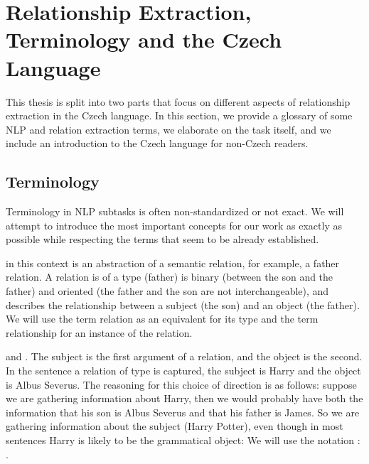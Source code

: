 \chapter{Relationship Extraction, Terminology and the Czech Language} 

This thesis is split into two parts that focus on different aspects of relationship extraction in the Czech language. In this section, we provide a glossary of some NLP and relation extraction terms, we elaborate on the task itself, and we include an introduction to the Czech language for non-Czech readers.


\section{Terminology}
Terminology in NLP subtasks is often non-standardized or not exact. We will attempt to introduce the most important concepts for our work as exactly as possible while respecting the terms that seem to be already established. 


 in this context is an abstraction of a semantic relation, for example, a father relation. A relation is of a type (father) is binary (between the son and the father) and oriented (the father and the son are not interchangeable), and describes the relationship between a subject (the son) and an object (the father). We will use the term relation as an equivalent for its type and the term relationship for an instance of the relation. 


 and . The subject is the first argument of a relation, and the object is the second. In the sentence  a relation of type  is captured, the subject is Harry and the object is Albus Severus. The reasoning for this choice of direction is as follows: suppose we are gathering information about Harry, then we would probably have both the information that his son is Albus Severus and that his father is James. So we are gathering information about the subject (Harry Potter), even though in most sentences Harry is likely to be the grammatical object:  We will use the notation : . 




